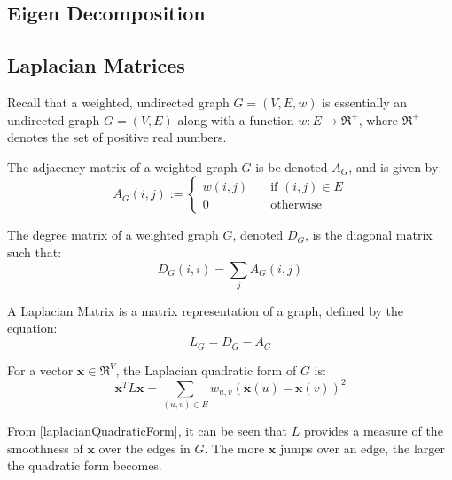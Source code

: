 \subsection{Eigen Decomposition}
\label{eigenDecomposition}

\subsection{Laplacian Matrices}
\label{laplacianMatrices}
\nocite{Berkeley:1999,Pati:2011,Spielman:2006}
Recall that a weighted, undirected graph $G = (V,E,w)$ is essentially an
undirected graph $G = (V,E)$ along with a function $w : E \rightarrow \Re^+$,
where $\Re^+$ denotes the set of positive real numbers.

The adjacency matrix of a weighted graph $G$ is be denoted $A_G$, and is given
by:
\begin{equation}
A_{G}(i,j) :=
    \left\{
        \begin{array}{ll}
            \mathit{w}(i,j) &   \quad \text{if $(i,j) \in E$}\\
            0 &                 \quad \text{otherwise}
        \end{array}
    \right.
\end{equation}

The degree matrix of a weighted graph $G$, denoted $D_G$, is the diagonal matrix
such that:
\begin{equation}
D_G(i,i) = \sum_j A_G(i,j)
\end{equation}

A Laplacian Matrix is a matrix representation of a graph, defined by the
equation:
\begin{equation}
L_G = D_G - A_G
\end{equation}

For a vector $\textbf{x} \in \Re^V$, the Laplacian quadratic form of $G$ is:
\begin{equation}
\label{laplacianQuadraticForm}
\textbf{x}^T L \textbf{x} = \sum_{(u,v) \in E} w_{u,v}(\textbf{x}(u) - \textbf{x}(v))^2
\end{equation}

From \autoref{laplacianQuadraticForm}, it can be seen that $L$ provides a
measure of the smoothness of $\textbf{x}$ over the edges in $G$. The more
$\textbf{x}$ jumps over an edge, the larger the quadratic form becomes.

